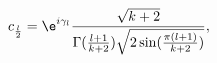 \begin{equation}
c_{l\over 2}=\e^{i\gamma_l}{\sqrt{k+2}\over
\Gamma({l+1\over k+2})\sqrt{2\sin({\pi (l+1)\over k+2})}},
\label{clnorm}
\end{equation}

